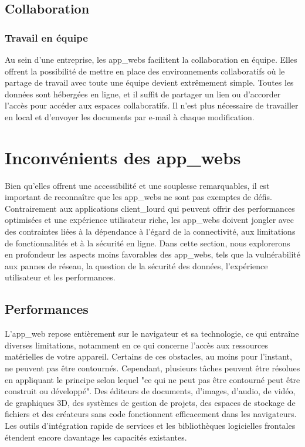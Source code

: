 \documentclass[a4paper, 12pt, french]{article}
\begin{document}
			\subsection{Collaboration}
				\subsubsection{Travail en équipe}
					Au sein d'une entreprise, les \glspl{app_web} facilitent la collaboration en équipe. Elles offrent la possibilité de mettre en place des environnements collaboratifs où le partage de travail avec toute une équipe devient extrêmement simple. Toutes les données sont hébergées en ligne, et il suffit de partager un lien ou d'accorder l'accès pour accéder aux espaces collaboratifs. Il n'est plus nécessaire de travailler en local et d'envoyer les documents par e-mail à chaque modification.			
			
		\section{Inconvénients des \glspl{app_web}}
			Bien qu'elles offrent une accessibilité et une souplesse remarquables, il est important de reconnaître que les \glspl{app_web} ne sont pas exemptes de défis. Contrairement aux applications \gls{client_lourd} qui peuvent offrir des performances optimisées et une expérience utilisateur riche, les \glspl{app_web} doivent jongler avec des contraintes liées à la dépendance à l'égard de la connectivité, aux limitations de fonctionnalités et à la sécurité en ligne. Dans cette section, nous explorerons en profondeur les aspects moins favorables des \glspl{app_web}, tels que la vulnérabilité aux pannes de réseau, la question de la sécurité des données, l'expérience utilisateur et les performances.
						
			\subsection{Performances}
				L'\gls{app_web} repose entièrement sur le navigateur et sa technologie, ce qui entraîne diverses limitations, notamment en ce qui concerne l'accès aux ressources matérielles de votre appareil. Certains de ces obstacles, au moins pour l'instant, ne peuvent pas être contournés. Cependant, plusieurs tâches peuvent être résolues en appliquant le principe selon lequel "ce qui ne peut pas être contourné peut être construit ou développé". Des éditeurs de documents, d'images, d'audio, de vidéo, de graphiques 3D, des systèmes de gestion de projets, des espaces de stockage de fichiers et des créateurs sans code fonctionnent efficacement dans les navigateurs. Les outils d'intégration rapide de services et les bibliothèques logicielles frontales étendent encore davantage les capacités existantes.\\
\end{document}
